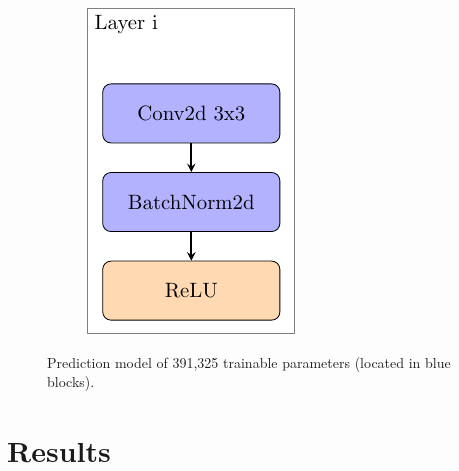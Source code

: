 \begin{figure}[ht!]
{\begin{subfigure}[b]{.30\textwidth}
			\includegraphics[width=\textwidth]{Figures/chapter_classification/figures/modellayer.pdf}\\
			\vspace{2cm}
		\end{subfigure}
	}
	\hfill 
	\caption[Prediction model]{Prediction model of 391,325 trainable parameters (located in blue blocks).}  
	\label{class2:fig:drmodel} 
\end{figure}

\section{Results}\label{class2:sec:results}

